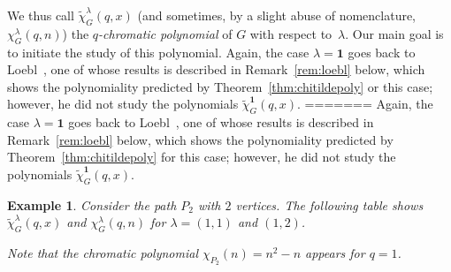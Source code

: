 \documentclass[11pt]{amsart}
\newtheorem{exam}{Example}
\newenvironment{example}{\begin{exam}\sf}{\end{exam}}
\newcommand\bone{\mathbf{1}}
\begin{document}
We thus call $\widetilde{\chi}_G^\lambda(q,x)$ (and sometimes, by a slight abuse of nomenclature, $\chi_G^\lambda(q,n)$) the \emph{$q$-chromatic polynomial} of $G$ with respect to~$\lambda$.
Our main goal is to initiate the study of this polynomial.
Again, the case $\lambda = \bone$ goes back to Loebl~\cite{loebl}, one of whose results is described in Remark~\ref{rem:loebl} below, which shows the polynomiality predicted by Theorem~\ref{thm:chitildepoly} or this case; however, he did not study the polynomials $\widetilde{\chi}_G^\bone(q,x)$.
=======
Again, the case $\lambda = \bone$ goes back to Loebl~\cite{loebl}, one of whose results is
described in Remark~\ref{rem:loebl} below, which shows the polynomiality predicted by Theorem~\ref{thm:chitildepoly}
for this case; however, he did not study the polynomials $\widetilde{\chi}_G^\bone(q,x)$.


\begin{example} \label{ex:path}
Consider the path $P_2$ with $2$ vertices. The following table shows $\widetilde{\chi}_G^\lambda(q,x)$ and  $ \chi_G^\lambda(q,n)$ for $\lambda = (1,1)$ and $(1,2)$.
\begin{center}
\noindent{}
\end{center}
%
\noindent Note that the chromatic polynomial $\chi_{P_2}(n)=n^2-n$ appears for $q=1$.
\end{example}
\end{document}
